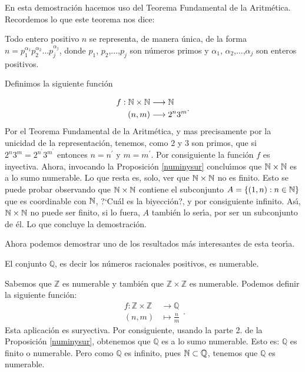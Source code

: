 En esta demostraci\'on hacemos uso del Teorema Fundamental de la
Aritm\'etica. Recordemos lo que este teorema nos dice:


\begin{itshape}\noindent Todo entero positivo $n$ se representa, de
manera \'unica, de la forma $n=p_1^{\alpha_1}p_2^{\alpha_2}\dots
p_j^{\alpha_j}$, donde $p_1$, $p_2$,...,$p_j$ son n\'umeros primos
y $\alpha_1$, $\alpha_2$,...,$\alpha_j$ son enteros positivos.
\end{itshape}

Definimos la siguiente funci\'on

\[\begin{split}
f:\nn\times\nn&\longrightarrow\nn\\
 (n,m)&\longrightarrow 2^n3^m\\
 \end{split}.
 \]
Por el Teorema Fundamental de la Aritm\'etica, y mas precisamente
por la unicidad de la representaci\'on, tenemos, como $2$ y $3$
son primos, que si $2^n3^m=2^{n^{\prime}}3^{m^{\prime}}$ entonces
$n=n^{\prime}$ y $m=m^{\prime}$. Por consiguiente la funci\'on $f$
es inyectiva. Ahora, invocando la Proposici\'on \vref{numinysur}
conclu\'{\i}mos que $\nn\times\nn$ es a lo sumo numerable. Lo que
resta es, solo, ver que $\nn\times\nn$ no es finito. Esto se puede
probar observando que $\nn\times\nn$ contiene el subconjunto
$A=\{(1,n):n\in\nn\}$ que es coordinable con $\nn$, ?`Cu\'al es la
biyecci\'on?, y por consiguiente infinito. As\'{\i},
$\nn\times\nn$ no puede ser finito, si lo fuera, $A$ tambi\'en lo
ser\'{\i}a, por ser un subconjunto de \'el. Lo que concluye la
demostraci\'on.

Ahora podemos demostrar  uno de los resultados m\'as interesantes
de esta teor\'{\i}a.

\begin{teorema} El conjunto $\mathbb{Q}$, es decir los n\'umeros
racionales positivos, es numerable.
\end{teorema}
\begin{demo} Sabemos que $\mathbb{Z}$ es numerable
y tambi\'en que $\mathbb{Z}\times\mathbb{Z}$ es numerable. Podemos
definir la siguiente funci\'on:
\[
\begin{split}
f:\mathbb{Z}\times\mathbb{Z}&\longrightarrow\mathbb{Q}\\
(n,m)&\longmapsto \frac{n}{m}
\end{split}
.\] Esta aplicaci\'on es suryectiva. Por consiguiente, usando la
parte 2. de la Proposici\'on \vref{numinysur}, obtenemos que
$\mathbb{Q}$ es a lo sumo numerable. Esto es: $\mathbb{Q}$ es
finito o numerable. Pero como $\mathbb{Q}$ es infinito, pues
$\nn\subset\mathbb{Q}$, tenemos que $\mathbb{Q}$ es numerable.
\end{demo}


